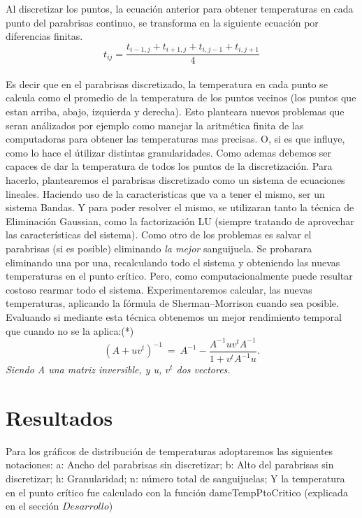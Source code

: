 \documentclass[a4paper]{article}
\begin{document}
Al discretizar los puntos, la ecuación anterior para obtener temperaturas en cada punto del parabrisas continuo, se transforma en la siguiente ecuación por diferencias finitas.
\begin{equation}
t_{ij} = \frac{t_{i-1,j} + t_{i+1,j} + t_{i,j-1} + t_{i,j+1}}{4}
\end{equation}\\
Es decir que en el parabrisas discretizado, la temperatura en cada punto se calcula como el promedio de la temperatura de los puntos vecinos (los puntos que estan arriba, abajo, izquierda y derecha).\newline
Esto planteara nuevos problemas que seran análizados por ejemplo como manejar la aritmética finita de las computadoras para obtener las temperaturas mas precisas. O, si es que influye, como lo hace el útilizar distintas granularidades.\newline
Como ademas debemos ser capaces de dar la temperatura de todos los puntos de la discretización. Para hacerlo, plantearemos el parabrisas discretizado como un sistema de ecuaciones lineales. Haciendo uso de la caracteristicas que va a tener el mismo, ser un sistema Bandas. 
 Y para poder resolver el mismo, se utilizaran tanto la técnica de Eliminación Gaussian, como la factorización LU (siempre tratando de aprovechar las características del sistema).\newline
Como otro de los problemas es salvar el parabrisas (si es posible) eliminando \textit{la mejor} sanguijuela. Se probarara eliminando una por una, recalculando todo el sistema y  obteniendo las nuevas temperaturas en el punto crítico. Pero, como computacionalmente puede resultar costoso rearmar todo el sistema. Experimentaremos calcular, las nuevas temperaturas, aplicando la fórmula de Sherman–Morrison cuando sea posible. Evaluando si mediante esta técnica obtenemos un mejor rendimiento temporal que cuando no se la aplica:(*)
\begin{equation}
	(A+ uv^t)^{-1} \ =\ A^{-1} - \frac{ A^{-1} u v^t A^{-1} }{1+v^t A^{-1}u}.\label{eq:sm}
\end{equation} 
\textit{Siendo A una matriz inversible, y u, $v^t$ dos vectores.}   
   
 \newpage


\section{Resultados}


Para los gráficos de distribución de temperaturas adoptaremos las siguientes notaciones:\newline
a: Ancho del parabrisas sin discretizar; \newline
b: Alto del parabrisas sin discretizar; \newline
h: Granularidad;\newline
n: número total de sanguijuelas;\newline
Y la temperatura en el punto crítico fue calculado con la función dameTempPtoCritico (explicada en el sección $Desarrollo$)\newline
\end{document}
